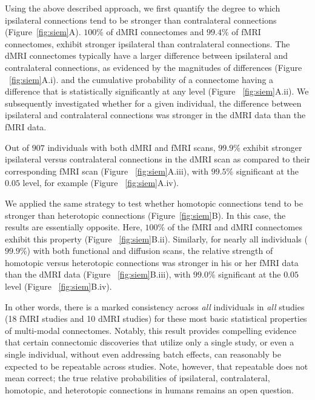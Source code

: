 \documentclass[11pt]{article}
\begin{document}
\begin{multicols}{2}
Using the above described approach, we first quantify the degree to which ipsilateral connections tend to be stronger than contralateral connections (Figure~\ref{fig:siem}A).   
$100\%$ of dMRI connectomes and $99.4\%$ of fMRI connectomes, exhibit stronger ipsilateral than contralateral connections.
The dMRI connectomes typically have a larger difference between ipsilateral and contralateral connections, as evidenced by the magnitudes of differences (Figure ~\ref{fig:siem}A.i). and the cumulative probability of a connectome having a difference that is statistically significantly at any level (Figure ~\ref{fig:siem}A.ii).
We subsequently investigated whether for a given individual, the difference between ipsilateral and contralateral connections was stronger in the dMRI data than the fMRI data. 

Out of $907$ individuals with both dMRI and fMRI scans, $99.9\%$ exhibit  stronger ipsilateral versus contralateral connections in the dMRI scan as compared to their corresponding fMRI scan (Figure ~\ref{fig:siem}A.iii), with $99.5\%$ significant at the $0.05$ level, for example (Figure ~\ref{fig:siem}A.iv).

We applied the same strategy to test whether homotopic connections tend to be stronger than heterotopic connections (Figure~\ref{fig:siem}B). In this case, the results are essentially opposite. Here, $100\%$ of the fMRI and dMRI connectomes exhibit this property (Figure ~\ref{fig:siem}B.ii). Similarly, for nearly all individuals ($99.9\%$) with both functional and diffusion scans, the relative strength of homotopic versus heterotopic connections was stronger in his or her fMRI data than the dMRI data (Figure ~\ref{fig:siem}B.iii), with $99.0\%$ significant at the $0.05$ level (Figure ~\ref{fig:siem}B.iv).  


In other words, there is a marked consistency across \emph{all} individuals in \emph{all} studies (18 fMRI studies and 10 dMRI studies) for these most basic statistical properties of multi-modal connectomes. Notably, this result provides compelling evidence that certain connectomic discoveries that utilize only a single study, or even a single individual, without even addressing batch effects, can reasonably be expected to be repeatable across studies. Note, however, that repeatable does not mean correct; the true relative probabilities of ipsilateral, contralateral, homotopic, and heterotopic connections in humans remains an open question. 



\end{multicols}
\end{document}
